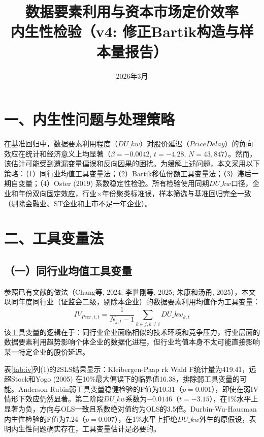 \documentclass[11pt,a4paper]{article}
\title{{\hei\Large 数据要素利用与资本市场定价效率} \\[8pt]
{\large 内生性检验（v4: 修正Bartik构造与样本量报告）}}
\author{}
\date{2026年3月}
\begin{document}
\maketitle
\thispagestyle{fancy}

\section*{一、内生性问题与处理策略}

在基准回归中，数据要素利用程度（$DU\_kw$）对股价延迟（$PriceDelay$）的负向效应在统计和经济意义上均显著（$\beta=-0.0042$, $t=-4.28$, $N=43{,}847$）。然而，该估计可能受到遗漏变量偏误和反向因果的困扰。为缓解上述问题，本文采用以下策略：（1）同行业均值工具变量法；（2）Bartik移位份额工具变量法；（3）滞后一期自变量；（4）Oster (2019) 系数稳定性检验。所有检验使用同期$DU\_kw$口径，企业和年份双向固定效应，行业$\times$年份聚类标准误，样本筛选与基准回归完全一致（剔除金融业、ST企业和上市不足一年企业）。

\section*{二、工具变量法}

\subsection*{（一）同行业均值工具变量}

参照已有文献的做法（Chang等, 2024; 李世刚等, 2025; 朱康和汤甬, 2025），本文以同年度同行业（证监会二级，剔除本企业）的数据要素利用均值作为工具变量：
\begin{equation}
IV_{Peer,i,t} = \frac{1}{N_{j,t}-1}\sum_{k \in j, k \neq i} DU\_kw_{k,t}
\end{equation}
该工具变量的逻辑在于：同行业企业面临相似的技术环境和竞争压力，行业层面的数据要素利用趋势影响个体企业的数据化进程，但行业均值本身不太可能直接影响某一特定企业的股价延迟。

表\ref{tab:iv}列(1)的2SLS结果显示：Kleibergen-Paap rk Wald F统计量为419.41，远超Stock和Yogo (2005) 在10\%最大偏误下的临界值16.38，排除弱工具变量的可能。Anderson-Rubin弱工具变量稳健检验的F值为10.31（$p=0.001$），即使在弱IV情形下效应仍然显著。第二阶段$DU\_kw$系数为$-0.0146$（$t=-3.15$），在1\%水平上显著为负，方向与OLS一致且系数绝对值约为OLS的3.5倍。Durbin-Wu-Hausman内生性检验的F值为7.24（$p=0.007$），在1\%水平上拒绝$DU\_kw$外生的原假设，表明内生性问题确实存在，工具变量估计是必要的。
\end{document}
